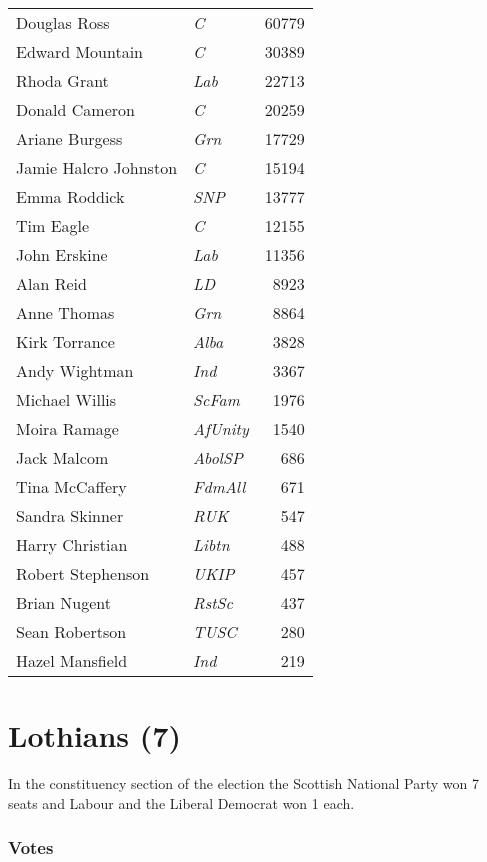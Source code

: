 {\footnotesize
\begin{tabular*}{\columnwidth}{@{\extracolsep{\fill}} p{} >{\itshape}l r @{\extracolsep{\fill}}}
	Douglas Ross & C & 60779\\%
	Edward Mountain & C & 30389\\%
	Rhoda Grant & Lab & 22713\\%
	Donald Cameron & C & 20259\\%
	Ariane Burgess & Grn & 17729\\%
	Jamie Halcro Johnston & C & 15194\\%
	Emma Roddick & SNP & 13777\\%
	\hline
	Tim Eagle & C & 12155\\
	John Erskine & Lab & 11356\\
	Alan Reid & LD & 8923\\
	Anne Thomas & Grn & 8864\\
	Kirk Torrance & Alba & 3828\\
	Andy Wightman & Ind & 3367\\
	Michael Willis & ScFam & 1976\\
	Moira Ramage & AfUnity & 1540\\
	Jack Malcom & AbolSP & 686\\
	Tina McCaffery & FdmAll & 671\\
	Sandra Skinner & RUK & 547\\
	Harry Christian & Libtn & 488\\
	Robert Stephenson & UKIP & 457\\
	Brian Nugent & RstSc & 437\\
	Sean Robertson & TUSC & 280\\
	Hazel Mansfield & Ind & 219\\
\end{tabular*}

}

\section[Lothians]{Lothians (7)}

In the constituency section of the election the Scottish National Party won 7 seats and Labour and the Liberal Democrat won 1 each.

\subsubsection*{Votes}

